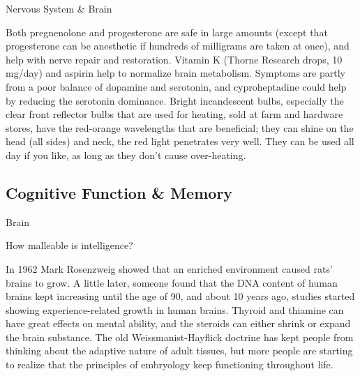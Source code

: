 \documentclass[11pt,oneside,openany,extrafontsizes]{memoir}
\begin{document}
\begin{standalonequote}{Nervous System \& Brain}

    \begin{answer}
      Both pregnenolone and progesterone are safe in large amounts (except that progesterone can be anesthetic if hundreds of milligrams are taken at once), and help with nerve repair and restoration. Vitamin K (Thorne Research drops, 10 mg/day) and aspirin help to normalize brain metabolism. Symptoms are partly from a poor balance of dopamine and serotonin, and cyproheptadine could help by reducing the serotonin dominance. Bright incandescent bulbs, especially the clear front reflector bulbs that are used for heating, sold at farm and hardware stores, have the red-orange wavelengths that are beneficial; they can shine on the head (all sides) and neck, the red light penetrates very well. They can be used all day if you like, as long as they don't cause over-heating.
    \end{answer}
\end{standalonequote}

\subsection{Cognitive Function \& Memory}

\begin{qaexchange}{Brain}

    \begin{question}
        How malleable is intelligence?
    \end{question}

    \begin{answer}
      In 1962 Mark Rosenzweig showed that an enriched environment caused rats' brains to grow. A little later, someone found that the DNA content of human brains kept increasing until the age of 90, and about 10 years ago, studies started showing experience-related growth in human brains. Thyroid and thiamine can have great effects on mental ability, and the steroids can either shrink or expand the brain substance. The old Weissmanist-Hayflick doctrine has kept people from thinking about the adaptive nature of adult tissues, but more people are starting to realize that the principles of embryology keep functioning throughout life.
    \end{answer}
\end{qaexchange}
\end{document}
